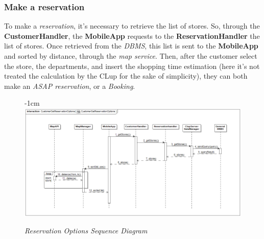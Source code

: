 \documentclass{article}
\begin{document}
	\subsubsection{Make a reservation}
	To make a \emph{reservation}, it's necessary to retrieve the list of stores. So, through the {\bfseries CustomerHandler}, the {\bfseries MobileApp} requests to the {\bfseries ReservationHandler} the list of stores. Once retrieved from the \emph{DBMS}, this list is sent to the {\bfseries MobileApp} and sorted by distance, through the \emph{map service}.
	Then, after the customer select the store, the departments, and insert the shopping time estimation (here it's not treated the calculation by the CLup for the sake of simplicity), they can both make an \emph{ASAP reservation}, or a \emph{Booking}.
	\begin{figure}[H]
		\begin{adjustwidth} {-1cm}{}
			\centering
			\includegraphics[scale=0.4]{Sequence Diagrams/sd__CustomerGetReservationOptions__CustomerGetReservationOptions.png}
		\end{adjustwidth}
		\caption{\emph{Reservation Options Sequence Diagram}}
	\end{figure}
\end{document}

